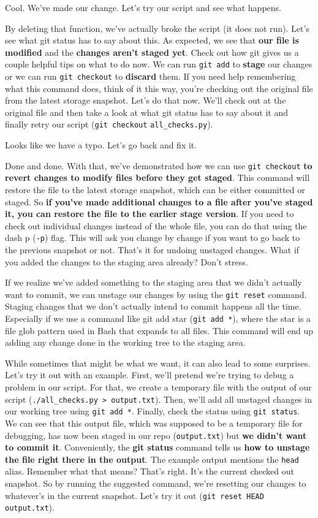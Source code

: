 	Cool. We've made our change. Let's try our script and see what happens.
	
	By deleting that function, we've actually broke the script (it does not run). Let's see what git status has to say about this. As expected, we see that \textbf{our file is modified} and the \textbf{changes aren't staged yet}. Check out how git gives us a couple helpful tips on what to do now. We can run \texttt{git add} to \textbf{stage} our changes or we can run \texttt{git checkout} to \textbf{discard} them. 
	If you need help remembering what this command does, think of it this way, you're checking out the original file from the latest storage snapshot. Let's do that now. We'll check out at the original file and then take a look at what git status has to say about it and finally retry our script (\texttt{git checkout} \verb|all_checks.py|).
	 
	Looks like we have a typo. Let's go back and fix it.
	
	Done and done. With that, we've demonstrated how we can use \texttt{git checkout} \textbf{to revert changes to modify files before they get staged}. This command will restore the file to the latest storage snapshot, which can be either committed or staged. So \textbf{if you've made additional changes to a file after you've staged it, you can restore the file to the earlier stage version}. If you need to check out individual changes instead of the whole file, you can do that using the dash p (\verb|-p|) flag. This will ask you change by change if you want to go back to the previous snapshot or not. That's it for undoing unstaged changes. What if you added the changes to the staging area already? Don't stress. 
	
	If we realize we've added something to the staging area that we didn't actually want to commit, we can unstage our changes by using the \texttt{git reset} command. Staging changes that we don't actually intend to commit happens all the time. 
	Especially if we use a command like git add star (\verb|git add *|), where the star is a file glob pattern used in Bash that expands to all files. This command will end up adding any change done in the working tree to the staging area. 

	While sometimes that might be what we want, it can also lead to some surprises. Let's try it out with an example. First, we'll pretend we're trying to debug a problem in our script. For that, we create a temporary file with the output of our script (\verb|./all_checks.py > output.txt|). Then, we'll add all unstaged changes in our working tree using \verb|git add *|. 
	Finally, check the status using \texttt{git status}. 
	We can see that this output file, which was supposed to be a temporary file for debugging, has now been staged in our repo (\verb|output.txt|) but\textbf{ we didn't want to commit it}. Conveniently, the \textbf{git status} command tells us \textbf{how to unstage the file right there in the output}. The example output mentions the \texttt{head} alias. Remember what that means? That's right. It's the current checked out snapshot. So by running the suggested command, we're resetting our changes to whatever's in the current snapshot. Let's try it out (\texttt{git reset HEAD} \verb|output.txt|).
	
